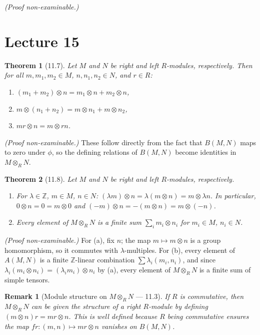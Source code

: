 \documentclass[12pt]{article}
\newtheorem{theorem}{Theorem}
\newtheorem{remark}{Remark}
\begin{document}
\noindent\textit{(Proof non-examinable.)} 

\section*{Lecture 15}

\begin{theorem}[11.7]
Let $M$ and $N$ be right and left $R$-modules, respectively. Then for all $m, m_1, m_2 \in M$, $n, n_1, n_2 \in N$, and $r \in R$:
\begin{enumerate}[label=(\roman*)]
  \item $(m_1 + m_2) \otimes n = m_1 \otimes n + m_2 \otimes n$,
  \item $m \otimes (n_1 + n_2) = m \otimes n_1 + m \otimes n_2$,
  \item $mr \otimes n = m \otimes rn$.
\end{enumerate}
\end{theorem}

\noindent\textit{(Proof non-examinable.)} These follow directly from the fact that $B(M,N)$ maps to zero under $\phi$, so the defining relations of $B(M,N)$ become identities in $M \otimes_R N$.

\begin{theorem}[11.8]
Let $M$ and $N$ be right and left $R$-modules, respectively.
\begin{enumerate}[label=(\alph*)]
  \item For $\lambda \in \mathbb{Z}$, $m \in M$, $n \in N$: $(\lambda m) \otimes n = \lambda(m \otimes n) = m \otimes \lambda n$. In particular, $0 \otimes n = 0 = m \otimes 0$ and $(-m) \otimes n = -(m \otimes n) = m \otimes (-n)$.
  \item Every element of $M \otimes_R N$ is a finite sum $\sum_i m_i \otimes n_i$ for $m_i \in M$, $n_i \in N$.
\end{enumerate}
\end{theorem}

\noindent\textit{(Proof non-examinable.)} For (a), fix $n$; the map $m \mapsto m \otimes n$ is a group homomorphism, so it commutes with $\lambda$-multiples. For (b), every element of $A(M,N)$ is a finite $\mathbb{Z}$-linear combination $\sum \lambda_i(m_i, n_i)$, and since $\lambda_i(m_i \otimes n_i) = (\lambda_i m_i) \otimes n_i$ by (a), every element of $M \otimes_R N$ is a finite sum of simple tensors.

\begin{remark}[Module structure on $M \otimes_R N$ — 11.3]
If $R$ is commutative, then $M \otimes_R N$ can be given the structure of a right $R$-module by defining $(m \otimes n)r = mr \otimes n$. This is well defined because $R$ being commutative ensures the map $fr : (m,n) \mapsto mr \otimes n$ vanishes on $B(M,N)$.
\end{remark}
\end{document}
